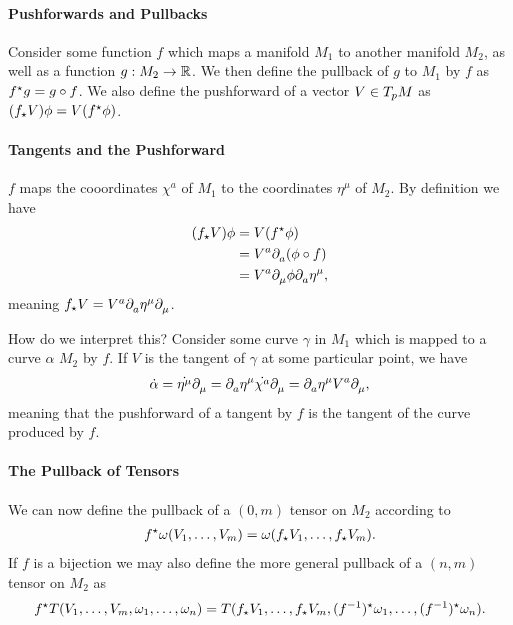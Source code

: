\paragraph{Pushforwards and Pullbacks}
Consider some function $f$ which maps a manifold $M_{1}$ to another manifold $M_{2}$, as well as a function $g: M_{2}\to\mathbb{R}$. We then define the pullback of $g$ to $M_{1}$ by $f$ as $f^{\star}g = g\circ f$. We also define the pushforward of a vector $V\in T_{p}M$ as $(f_{\star}V)\phi = V(f^{\star}\phi)$.

\paragraph{Tangents and the Pushforward}
$f$ maps the cooordinates $\chi^{a}$ of $M_{1}$ to the coordinates $\eta^{\mu}$ of $M_{2}$. By definition we have
\begin{align*}
	(f_{\star}V)\phi &= V(f^{\star}\phi) \\
	                 &= V^{a}\partial^{}_{a}(\phi\circ f) \\
	                 &= V^{a}\partial^{}_{\mu}\phi\partial^{}_{a}\eta^{\mu},
\end{align*}
meaning $f_{\star}V = V^{a}\partial^{}_{a}\eta^{\mu}\partial^{}_{\mu}$.

How do we interpret this? Consider some curve $\gamma$ in $M_{1}$ which is mapped to a curve $\alpha$ $M_{2}$ by $f$. If $V$ is the tangent of $\gamma$ at some particular point, we have
\begin{align*}
	\dot{\alpha} = \dot{\eta^{\mu}}\partial^{}_{\mu} = \partial^{}_{a}\eta^{\mu}\dot{\chi^{a}}\partial^{}_{\mu} = \partial^{}_{a}\eta^{\mu}V^{a}\partial^{}_{\mu},
\end{align*}
meaning that the pushforward of a tangent by $f$ is the tangent of the curve produced by $f$.

\paragraph{The Pullback of Tensors}
We can now define the pullback of a $(0, m)$ tensor on $M_{2}$ according to
\begin{align*}
	f^{\star}\omega(V_{1}, \dots, V_{m}) = \omega(f_{\star}V_{1}, \dots, f_{\star}V_{m}).
\end{align*}
If $f$ is a bijection we may also define the more general pullback of a $(n, m)$ tensor on $M_{2}$ as
\begin{align*}
	f^{\star}T(V_{1}, \dots, V_{m}, \omega_{1}, \dots, \omega_{n}) = T(f_{\star}V_{1}, \dots, f_{\star}V_{m}, (f^{-1})^{\star}\omega_{1}, \dots, (f^{-1})^{\star}\omega_{n}).
\end{align*}

